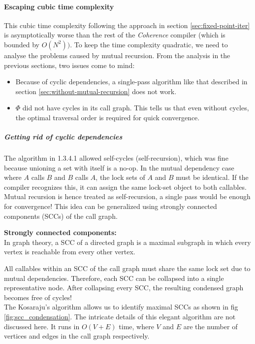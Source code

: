 \documentclass[a4paper,12pt,fleqn]{article}
\begin{document}
\paragraph{Escaping cubic time complexity\\}
This cubic time complexity following the approach in section \ref{sec:fixed-point-iter} is asymptotically worse than the rest of the \textit{Coherence} compiler (which is bounded by $O(N^2))$. To keep the time complexity quadratic, we need to analyse the problems caused by mutual recursion. From the analysis in the previous sections, two issues come to mind:
\begin{itemize}
  \item Because of cyclic dependencies, a single-pass algorithm like that described in section \ref{sec:without-mutual-recursion} does not work.
  \item $\Phi$ did not have cycles in its call graph. This tells us that even without cycles, the optimal traversal order is required for quick convergence.
\end{itemize}
\subparagraph{Getting rid of cyclic dependencies\\}
The algorithm in 1.3.4.1 allowed self-cycles (self-recursion), which was fine because unioning a set with itself is a no-op. In the mutual dependency case where $A$ calls $B$ and $B$ calls $A$, the lock sets of $A$ and $B$ must be identical. If the compiler recognizes this, it can assign the same lock-set object to both callables. Mutual recursion is hence treated as self-recursion, a single pass would be enough for convergence! This idea can be generalized using strongly connected components (SCCs) of the call graph.
\begin{notebox}
  \textbf{Strongly connected components:\\}
  In graph theory, a SCC of a directed graph is a maximal subgraph in which every vertex is reachable from every other vertex.
\end{notebox}
All callables within an SCC of the call graph must share the same lock set due to mutual dependencies. Therefore, each SCC can be collapsed into a single representative node. After collapsing every SCC, the resulting condensed graph becomes free of cycles!\\
The Kosaraju's algorithm\cite{scc} allows us to identify maximal SCCs as shown in fig \ref{fig:scc_condensation}. The intricate details of this elegant algorithm are not discussed here. It runs in $O(V + E)$ time, where $V$ and $E$ are the number of vertices and edges in the call graph respectively.
\end{document}
